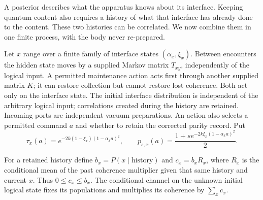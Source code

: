 \documentclass[11pt]{article}
\theoremstyle{definition}
\theoremstyle{remark}
\begin{document}
A posterior describes what the apparatus knows about its interface. Keeping
quantum content also requires a history of what that interface has already
done to the content. These two histories can be correlated. We now combine
them in one finite process, with the body never re-prepared.

Let $x$ range over a finite family of interface states
$(\alpha_x,\xi_x)$. Between encounters the hidden state moves by a supplied
Markov matrix $T_{xy}$, independently of the logical input. A permitted
maintenance action acts first through another supplied matrix $K$; it can
restore collection but cannot restore lost coherence. Both act only on the
interface state. The initial interface distribution is independent of the
arbitrary logical input; correlations created during the history are retained.
Incoming ports are independent vacuum preparations.
An action also selects a permitted command $a$ and whether to retain the
corrected parity record. Put
\[
 \tau_x(a)=e^{-2k(1-\xi_x)(1-\alpha_xa)^2},\qquad
 p_{s,x}(a)=\frac{1+s e^{-2k\xi_x(1-\alpha_xa)^2}}2.
\]

For a retained history define $b_x=P(x\mid\text{history})$ and
$c_x=b_xR_x$, where $R_x$ is the conditional mean of the past coherence
multiplier given that same history and current $x$. Thus $0\le c_x\le b_x$.
The conditional channel on the unknown initial logical state fixes its
populations and multiplies its coherence by $\sum_xc_x$.
\end{document}
